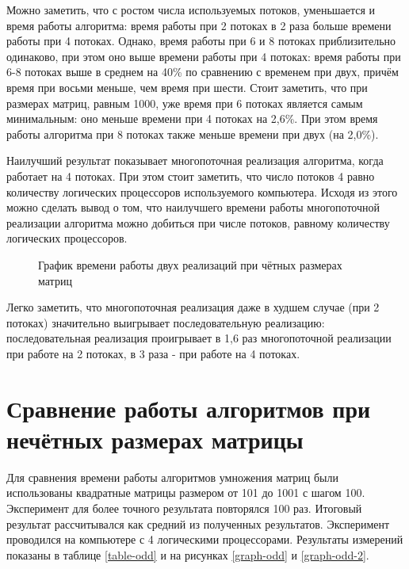 \documentclass[12pt, a4paper]{report}
\begin{document}
	Можно заметить, что с ростом числа используемых потоков, уменьшается и время работы алгоритма: время работы при 2 потоках в 2 раза больше времени работы при 4 потоках. Однако, время работы при 6 и 8 потоках приблизительно одинаково, при этом оно выше времени работы при 4 потоках: время работы при 6-8 потоках выше в среднем на 40\% по сравнению с временем при двух, причём время при восьми меньше, чем время при шести.
	Стоит заметить, что при размерах матриц, равным 1000, уже время при 6 потоках является самым минимальным: оно меньше времени при 4 потоках на 2,6\%. При этом время работы алгоритма при 8 потоках также меньше времени при двух (на 2,0\%).
	
	Наилучший результат показывает многопоточная реализация алгоритма, когда работает на 4 потоках. При этом стоит заметить, что число потоков 4 равно количеству логических процессоров используемого компьютера. Исходя из этого можно сделать вывод о том, что наилучшего времени работы многопоточной реализации алгоритма можно добиться при числе потоков, равному количеству логических процессоров.
	
	\begin{figure}[ht!]
		\caption{График времени работы двух реализаций при чётных размерах матриц}
		\label{graph-even-2}
	\end{figure}
	
	Легко заметить, что многопоточная реализация даже в худшем случае (при 2 потоках) значительно выигрывает последовательную реализацию: последовательная реализация проигрывает в 1,6 раз многопоточной реализации при работе на 2 потоках, в 3 раза - при работе на 4 потоках.
	
	\section{Сравнение работы алгоритмов при нечётных размерах матрицы}
	Для сравнения времени работы алгоритмов умножения матриц были использованы квадратные матрицы размером от 101 до 1001 с шагом 100. Эксперимент для более точного результата повторялся 100 раз. Итоговый результат рассчитывался как средний из полученных результатов. Эксперимент проводился на компьютере с 4 логическими процессорами. Результаты измерений показаны в таблице \ref{table-odd} и на рисунках \ref{graph-odd} и \ref{graph-odd-2}.\\
	
\end{document}
